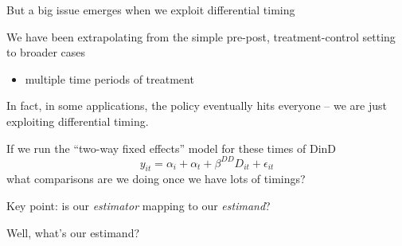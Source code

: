 \documentclass[notes,11pt, aspectratio=169]{beamer}
\newenvironment{wideitemize}{\itemize\addtolength{\itemsep}{10pt}}{\enditemize}
\begin{document}
\begin{frame}{But a big issue emerges when we exploit differential timing}
  \begin{wideitemize}
  \item We have been extrapolating from the simple pre-post,
    treatment-control setting to broader cases
    \begin{itemize}
    \item multiple time periods of treatment
    \end{itemize}
  \item In fact, in some applications, the policy eventually hits everyone --
    we are just exploiting differential timing.
  \item If we run the ``two-way fixed effects'' model for these times of DinD
    \begin{equation}
      y_{it} = \alpha_{i} + \alpha_{t} + \beta^{DD}D_{it} + \epsilon_{it}
    \end{equation}
    what comparisons are we doing once we have lots of timings?
  \item Key point: is our \emph{estimator} mapping to our \emph{estimand}?
  \item Well, what's our estimand?
\end{wideitemize}
\end{frame}
\end{document}
